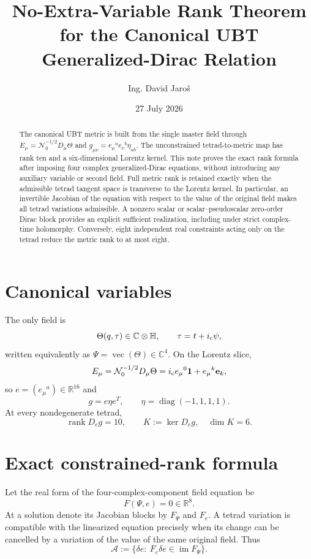 \documentclass[11pt,a4paper]{article}
\title{No-Extra-Variable Rank Theorem for the Canonical UBT Generalized-Dirac Relation}
\author{Ing. David Jaro\v{s}}
\date{27 July 2026}
\begin{document}
\maketitle

\begin{abstract}
The canonical UBT metric is built from the single master field through
$E_\mu=\mathcal N_0^{-1/2}D_\mu\Theta$ and
$g_{\mu\nu}=e_\mu{}^ae_\nu{}^b\eta_{ab}$.  The unconstrained tetrad-to-metric
map has rank ten and a six-dimensional Lorentz kernel.  This note proves the
exact rank formula after imposing four complex generalized-Dirac equations,
without introducing any auxiliary variable or second field.  Full metric rank
is retained exactly when the admissible tetrad tangent space is transverse to
the Lorentz kernel.  In particular, an invertible Jacobian of the equation
with respect to the value of the original field makes all tetrad variations
admissible.  A nonzero scalar or scalar--pseudoscalar zero-order Dirac block
provides an explicit sufficient realization, including under strict complex-
time holomorphy.  Conversely, eight independent real constraints acting only
on the tetrad reduce the metric rank to at most eight.
\end{abstract}

\section{Canonical variables}
The only field is
\[
 \Theta(q,\tau)\in\mathbb C\otimes\mathbb H,
 \qquad \tau=t+i_{\rm c}\psi,
\]
written equivalently as $\Psi=\operatorname{vec}(\Theta)\in\mathbb C^4$.
On the Lorentz slice,
\[
 E_\mu=\mathcal N_0^{-1/2}D_\mu\Theta
 =i_{\rm c}e_\mu{}^0\mathbf1+e_\mu{}^k\mathbf e_k,
\]
so $e=(e_\mu{}^a)\in\mathbb R^{16}$ and
\[
 g=e\eta e^T,
 \qquad \eta=\operatorname{diag}(-1,1,1,1).
\]
At every nondegenerate tetrad,
\[
 \operatorname{rank}D_eg=10,
 \qquad K:=\ker D_eg,\quad\dim K=6.
\]

\section{Exact constrained-rank formula}
Let the real form of the four-complex-component field equation be
\[
 F(\Psi,e)=0\in\mathbb R^8.
\]
At a solution denote its Jacobian blocks by $F_\Psi$ and $F_e$.  A tetrad
variation is compatible with the linearized equation precisely when its
change can be cancelled by a variation of the value of the same original
field.  Thus
\[
 \mathcal A:=\{\delta e:\ F_e\delta e\in\operatorname{im}F_\Psi\}.
\]
\end{document}
